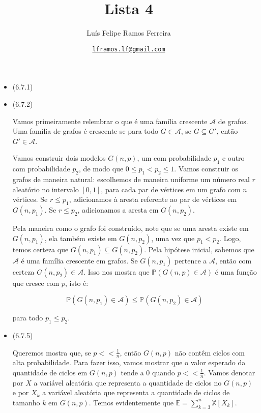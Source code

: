 \documentclass{article}
\title{Lista 4}
\author{Luís Felipe Ramos Ferreira}
\date{\href{mailto:lframos.lf@gmail.com}{\texttt{lframos.lf@gmail.com}}
}
\begin{document}
\maketitle

\begin{itemize}
	\item (6.7.1)
	\item (6.7.2)

	      Vamos primeiramente relembrar o que é uma família crescente \(\mathcal{A}\) de grafos. Uma família de grafos é crescente se para
	      todo \(G \in \mathcal{A}\), se \(G \subseteq G'\), então \(G' \in \mathcal{A}\).

	      Vamos construir dois modelos \(G(n, p)\), um com probabilidade \(p_1\) e outro com probabilidade \(p_2\), de modo que \(0 \leq p_1 < p_2 \leq 1\).
	      Vamos construir os grafos de maneira natural: escolhemos de maneira uniforme um número real \(r\) aleatório no intervalo \([0, 1]\), para cada par de vértices
	      em um grafo com \(n\) vértices. Se \(r \leq p_1\),  adicionamos à aresta referente ao par de vértices em \(G(n,p_1)\). Se \(r \leq p_2\), adicionamos a aresta
	      em \(G(n, p_2)\).

	      Pela maneira como o grafo foi construído, note que se uma aresta existe em \(G(n, p_1)\), ela também existe em \(G(n, p_2)\), uma vez que \(p_1 < p_2\). Logo, temos certeza
	      que \(G(n, p_1) \subseteq G(n, p_2)\). Pela hipótese inicial, sabemos que \(\mathcal{A}\) é uma família crescente em grafos. Se \(G(n, p_1)\) pertence a \(\mathcal{A}\),
	      então com certeza \(G(n, p_2) \in \mathcal{A}\). Isso nos mostra que \(\mathbb{P}(G(n, p) \in \mathcal{A})\) é uma função que cresce com \(p\), isto é:

	      \[\mathbb{P}(G(n, p_1) \in \mathcal{A}) \leq \mathbb{P}(G(n, p_2) \in \mathcal{A})\]

	      para todo \(p_1 \leq p_2\).

	\item (6.7.5)

	      Queremos mostra que, se \(p << \frac{1}{n}\), então \(G(n, p)\) não contêm ciclos com alta probabilidade. Para fazer isso, vamos mostrar que o valor esperado
	      da quantidade de ciclos em \(G(n,p)\) tende a 0 quando \(p << \frac{1}{n}\). Vamos denotar por \(X\) a variável aleatória que representa a quantidade de ciclos no \(G(n, p)\)
	      e por \(X_k\) a variável aleatória que representa a quantidade de ciclos de tamanho \(k\) em \(G(n, p)\). Temos evidentemente que \(\mathbb{E} = \sum_{k=3}^n \mathbb{X}[X_k]\).


\end{itemize}
\end{document}
